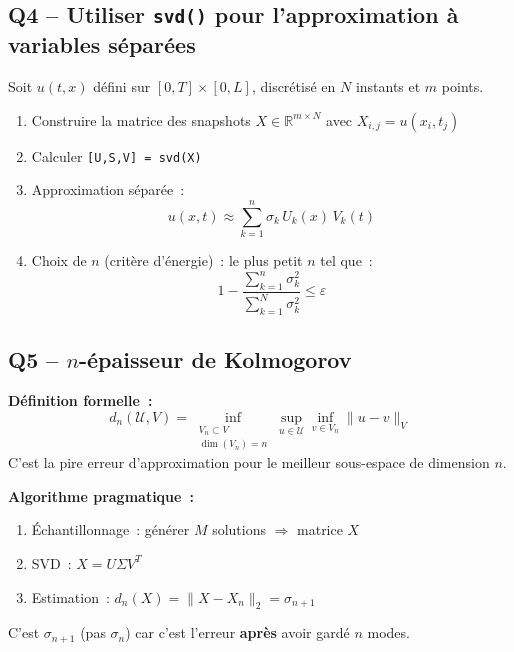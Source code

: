 \documentclass[11pt,a4paper]{article}
\begin{document}
\subsection{Q4 -- Utiliser \texttt{svd()} pour l'approximation \`a variables s\'epar\'ees}

\begin{formulabox}[Solution]
Soit $u(t,x)$ d\'efini sur $[0,T]\times[0,L]$, discr\'etis\'e en $N$ instants et $m$ points.

\begin{enumerate}[nosep]
\item Construire la matrice des snapshots $X \in \mathbb{R}^{m\times N}$ avec $X_{i,j} = u(x_i,t_j)$
\item Calculer \texttt{[U,S,V] = svd(X)}
\item Approximation s\'epar\'ee~:
\[
\boxed{u(x,t) \approx \sum_{k=1}^{n} \sigma_k\, U_k(x)\, V_k(t)}
\]
\item Choix de $n$ (crit\`ere d'\'energie)~: le plus petit $n$ tel que~:
\[
\boxed{1 - \frac{\sum_{k=1}^{n}\sigma_k^2}{\sum_{k=1}^{N}\sigma_k^2} \leq \varepsilon}
\]
\end{enumerate}
\end{formulabox}

\subsection{Q5 -- $n$-\'epaisseur de Kolmogorov}

\begin{formulabox}[Solution]
\textbf{D\'efinition formelle~:}
\[
\boxed{d_n(\mathcal{U},V) = \inf_{\substack{V_n \subset V \\ \dim(V_n)=n}} \sup_{u \in \mathcal{U}} \inf_{v \in V_n} \|u-v\|_V}
\]
C'est la pire erreur d'approximation pour le meilleur sous-espace de dimension $n$.

\medskip
\textbf{Algorithme pragmatique~:}
\begin{enumerate}[nosep]
\item \'Echantillonnage~: g\'en\'erer $M$ solutions $\Rightarrow$ matrice $X$
\item SVD~: $X = U\Sigma V^T$
\item Estimation~: $\boxed{d_n(X) = \|X - X_n\|_2 = \sigma_{n+1}}$
\end{enumerate}
\end{formulabox}

\begin{warningbox}[Pi\`ege]
C'est $\sigma_{n+1}$ (pas $\sigma_n$) car c'est l'erreur \textbf{apr\`es} avoir gard\'e $n$ modes.
\end{warningbox}
\end{document}
